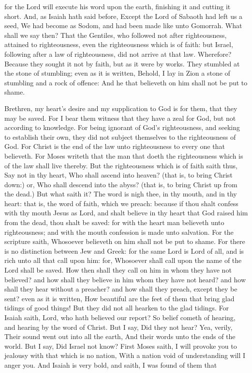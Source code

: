 for the Lord will execute his word upon the earth, finishing it and cutting it short. And, as Isaiah hath said before, Except the Lord of Sabaoth had left us a seed, We had become as Sodom, and had been made like unto Gomorrah.  What shall we say then? That the Gentiles, who followed not after righteousness, attained to righteousness, even the righteousness which is of faith: but Israel, following after a law of righteousness, did not arrive at that law. Wherefore? Because they sought it not by faith, but as it were by works. They stumbled at the stone of stumbling; even as it is written, Behold, I lay in Zion a stone of stumbling and a rock of offence: And he that believeth on him shall not be put to shame. 

Brethren, my heart’s desire and my supplication to God is for them, that they may be saved. For I bear them witness that they have a zeal for God, but not according to knowledge. For being ignorant of God’s righteousness, and seeking to establish their own, they did not subject themselves to the righteousness of God. For Christ is the end of the law unto righteousness to every one that believeth. For Moses writeth that the man that doeth the righteousness which is of the law shall live thereby. But the righteousness which is of faith saith thus, Say not in thy heart, Who shall ascend into heaven? (that is, to bring Christ down:) or, Who shall descend into the abyss? (that is, to bring Christ up from the dead.) But what saith it? The word is nigh thee, in thy mouth, and in thy heart: that is, the word of faith, which we preach: because if thou shalt confess with thy mouth Jesus as Lord, and shalt believe in thy heart that God raised him from the dead, thou shalt be saved: for with the heart man believeth unto righteousness; and with the mouth confession is made unto salvation. For the scripture saith, Whosoever believeth on him shall not be put to shame. For there is no distinction between Jew and Greek: for the same Lord is Lord of all, and is rich unto all that call upon him: for, Whosoever shall call upon the name of the Lord shall be saved. How then shall they call on him in whom they have not believed? and how shall they believe in him whom they have not heard? and how shall they hear without a preacher? and how shall they preach, except they be sent? even as it is written, How beautiful are the feet of them that bring glad tidings of good things!  But they did not all hearken to the glad tidings. For Isaiah saith, Lord, who hath believed our report? So belief cometh of hearing, and hearing by the word of Christ. But I say, Did they not hear? Yea, verily, Their sound went out into all the earth, And their words unto the ends of the world.  But I say, Did Israel not know? First Moses saith, I will provoke you to jealousy with that which is no nation, With a nation void of understanding will I anger you.  And Isaiah is very bold, and saith, I was found of them that 